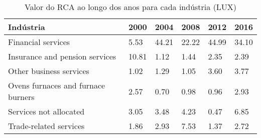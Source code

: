 \begin{table}
\centering
\caption{Valor do RCA ao longo dos anos para cada indústria (LUX)}
\begin{tabular}{p{6cm}p{1.5cm}p{1.5cm}p{1.5cm}p{1.5cm}p{1.5cm}}
\toprule
                         Indústria &  2000 &  2004 &  2008 &  2012 &  2016 \\
\midrule
                Financial services &  5.53 & 44.21 & 22.22 & 44.99 & 34.10 \\
    Insurance and pension services & 10.81 &  1.12 &  1.44 &  2.35 &  2.39 \\
           Other business services &  1.02 &  1.29 &  1.05 &  3.60 &  3.77 \\
Ovens furnaces and furnace burners &  2.57 &  0.70 &  0.98 &  0.96 &  2.93 \\
            Services not allocated &  3.05 &  3.48 &  4.23 &  0.47 &  6.85 \\
            Trade-related services &  1.86 &  2.93 &  7.53 &  1.37 &  2.72 \\
\bottomrule
\end{tabular}
\end{table}
